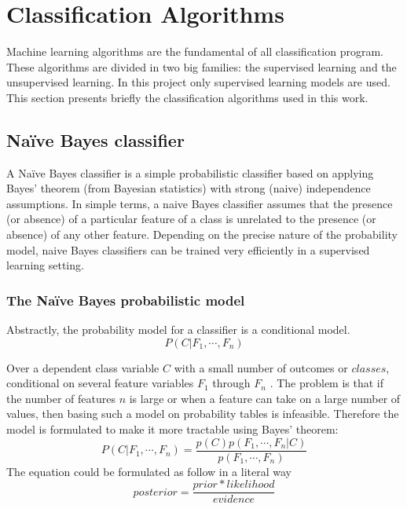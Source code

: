 
\chapter{Classification Algorithms} %

\label{Chapter4} %



Machine learning algorithms are the fundamental of all classification program. 
These algorithms are divided in two big families: the supervised learning and the unsupervised learning.
In this project only supervised learning models are used.
This section presents briefly the classification algorithms used in this work. 
\section{Naïve Bayes classifier}
A Naïve Bayes classifier\cite{website:Naive_Bayes_classifier} is a simple probabilistic classifier based on applying Bayes' theorem (from Bayesian
statistics) with strong (naive) independence assumptions. 
In simple terms, a naive Bayes classifier assumes that the presence (or absence) of a particular feature of a class is unrelated to the presence (or absence) of any other feature.
Depending on the precise nature of the probability model, naive Bayes classifiers can be trained very efficiently in a supervised learning setting.

\subsection{The Naïve Bayes probabilistic model}
Abstractly, the probability model for a classifier is a conditional model.
$$ P(C|F_1, \cdots, F_n) $$

Over a dependent class variable $C$ with a small number of outcomes or $classes$, conditional on several feature
variables $F_1$ through $F_n$ . The problem is that if the number of features $n$ is large or when a feature can take on a
large number of values, then basing such a model on probability tables is infeasible. Therefore the
model is formulated to make it more tractable using Bayes' theorem:
$$ P(C|F_1, \cdots, F_n) = \frac{p(C)p(F_1, \cdots, F_n|C)}{p(F_1, \cdots, F_n)}$$  The equation could be formulated as follow in a literal way $$posterior = \frac{prior * likelihood}{evidence}$$


